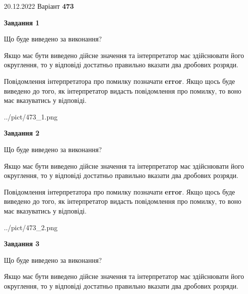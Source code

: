 \documentclass[12pt, ukrainian]{article}
\begin{document}
{20.12.2022 Варіант \No \textbf { 473 }\par}
{
\begin {Large}

{\begin {center}\textbf{Завдання 1}\end {center}}\par
Що буде виведено за виконання? \par

Якщо має бути виведено дійсне значення та інтерпретатор має здійснювати його округлення, 
то у відповіді достатньо правильно вказати два дробових розряди.

Повідомлення інтерпретатора про помилку позначати \textbf{error}.
Якщо щось буде виведено до того, як інтерпретатор видасть повідомлення про помилку, 
то воно має вказуватись у відповіді. \par

\begin{center}
	{../pict/473_1.png}
\end{center}
\newpage

{\begin {center}\textbf{Завдання 2}\end {center}}\par
Що буде виведено за виконання? \par

Якщо має бути виведено дійсне значення та інтерпретатор має здійснювати його округлення, 
то у відповіді достатньо правильно вказати два дробових розряди.

Повідомлення інтерпретатора про помилку позначати \textbf{error}.
Якщо щось буде виведено до того, як інтерпретатор видасть повідомлення про помилку, 
то воно має вказуватись у відповіді. \par

\begin{center}
	{../pict/473_2.png}
\end{center}
\newpage

{\begin {center}\textbf{Завдання 3}\end {center}}\par
Що буде виведено за виконання? \par

Якщо має бути виведено дійсне значення та інтерпретатор має здійснювати його округлення, 
то у відповіді достатньо правильно вказати два дробових розряди.


\end{Large}}
\end{document}
